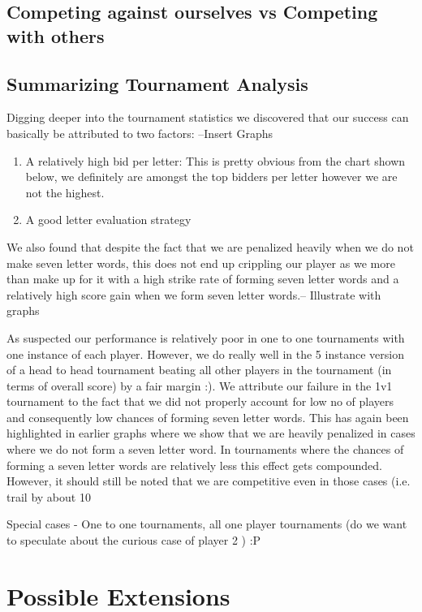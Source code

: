 \documentclass[11pt]{article}
\begin{document}
	\subsection{Competing against ourselves vs Competing with others}
	\subsection{Summarizing Tournament Analysis}
		
	Digging deeper into the tournament statistics we discovered that our success can basically be attributed to two factors:
	--Insert Graphs
	\begin{enumerate}
	\item{} A relatively high bid per letter: This is pretty obvious from the chart shown below, we definitely are amongst the top bidders per letter however we are not the highest.
	\item{} A good letter evaluation strategy
\end{enumerate}
	
	We also found that despite the fact that we are penalized heavily when we do not make seven letter words, this does not end up crippling our player as we more than make up for it with a high strike rate of forming seven letter words and a relatively high score gain when we form seven letter words.-- Illustrate with graphs
	
	As suspected our performance is relatively poor in one to one tournaments with one instance of each player. However, we do really well in the 5 instance version of a head to head tournament beating all other players in the tournament (in terms of overall score) by a fair margin :). We attribute our failure in the 1v1 tournament to the fact that we did not properly account for low no of players and consequently low chances of forming seven letter words. This has again been highlighted in earlier graphs where we show that we are heavily penalized in cases where we do not form a seven letter word. In tournaments where the chances of forming a seven letter words are relatively less this effect gets compounded. However, it should still be noted that we are competitive even in those cases (i.e. trail by about 10%
	
Special cases - One to one tournaments, all one player tournaments (do we want to speculate about the curious case of player 2 ) :P


\section{Possible Extensions}
\end{document}
